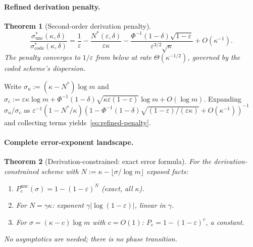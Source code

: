\documentclass[journal]{IEEEtran}
\makeatletter
\newtheorem{theorem}{Theorem}[section]
\numberwithin{equation}{section}
\renewenvironment{proof}[1][\proofname]{\par
  \pushQED{\qed}%
  \normalfont \topsep6\p@\@plus6\p@\relax
  \trivlist
  \item[\hskip\labelsep
        \itshape
    #1\@addpunct{.}]\ignorespaces
}{%
  \popQED\endtrivlist\@endpefalse
}
\makeatother
\begin{document}
\paragraph{Refined derivation penalty.}

\begin{theorem}[Second-order derivation penalty]
\label{thm:refined-penalty}
\begin{equation}\label{eq:refined-penalty}
  \frac{\sigma^*_{\mathrm{unc}}(\kappa,\delta)}
       {\sigma^*_{\mathrm{code}}(\kappa,\delta)}
  =\frac{1}{\varepsilon}
  -\frac{N^*(\varepsilon,\delta)}{\varepsilon\kappa}
  -\frac{\Phi^{-1}(1{-}\delta)\sqrt{1{-}\varepsilon}}
       {\varepsilon^{3/2}\sqrt\kappa}
  +O(\kappa^{-1}).
\end{equation}
The penalty converges to $1/\varepsilon$ from below at rate
$\Theta(\kappa^{-1/2})$, governed by the coded scheme's
dispersion.
\end{theorem}

\begin{proof}
Write $\sigma_u:=(\kappa{-}N^*)\log m$ and
$\sigma_c:=\varepsilon\kappa\log m
+\Phi^{-1}(1{-}\delta)
\sqrt{\kappa\varepsilon(1{-}\varepsilon)}\log m
+O(\log m)$.
Expanding $\sigma_u/\sigma_c$ as
$\varepsilon^{-1}(1{-}N^*/\kappa)
(1{-}\Phi^{-1}(1{-}\delta)
\sqrt{(1{-}\varepsilon)/(\varepsilon\kappa)}
+O(\kappa^{-1}))^{-1}$
and collecting terms yields~\eqref{eq:refined-penalty}.
\end{proof}

\paragraph{Complete error-exponent landscape.}

\begin{theorem}[Derivation-constrained: exact error formula]
\label{thm:unc-error-complete}
For the derivation-constrained scheme with
$N:=\kappa{-}\lfloor\sigma/\log m\rfloor$ exposed facts:
\begin{enumerate}[label=\textup{(\roman*)}]
\item $P_e^{\mathrm{unc}}(\sigma)
=1{-}(1{-}\varepsilon)^N$ \textup{(exact, all $\kappa$)}.
\item For $N=\gamma\kappa$:
exponent $\gamma|\!\log(1{-}\varepsilon)|$, linear in $\gamma$.
\item For $\sigma=(\kappa{-}c)\log m$ with $c=O(1)$:
$P_e=1{-}(1{-}\varepsilon)^c$, a constant.
\end{enumerate}
No asymptotics are needed; there is no phase transition.
\end{theorem}
\end{document}
